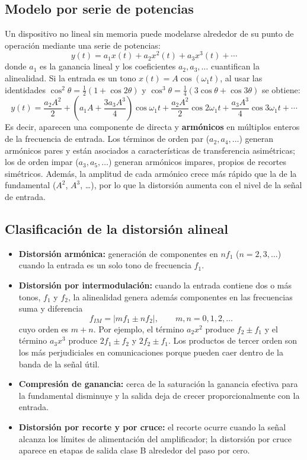 \documentclass[12pt]{article}
\begin{document}
\subsection*{Modelo por serie de potencias}

Un dispositivo no lineal sin memoria puede modelarse alrededor de su punto de operación mediante una serie de potencias:
\[
y(t) = a_1 x(t) + a_2 x^2(t) + a_3 x^3(t) + \cdots
\]
donde $a_1$ es la ganancia lineal y los coeficientes $a_2, a_3, \ldots$ cuantifican la alinealidad. Si la entrada es un tono $x(t) = A\cos(\omega_1 t)$, al usar las identidades $\cos^2\theta = \tfrac{1}{2}(1+\cos 2\theta)$ y $\cos^3\theta = \tfrac{1}{4}(3\cos\theta + \cos 3\theta)$ se obtiene:
\[
y(t) = \frac{a_2A^2}{2} + \left(a_1A + \frac{3a_3A^3}{4}\right)\cos\omega_1 t + \frac{a_2A^2}{2}\cos 2\omega_1 t + \frac{a_3A^3}{4}\cos 3\omega_1 t + \cdots
\]
Es decir, aparecen una componente de directa y \textbf{armónicos} en múltiplos enteros de la frecuencia de entrada. Los términos de orden par ($a_2, a_4, \ldots$) generan armónicos pares y están asociados a características de transferencia asimétricas; los de orden impar ($a_3, a_5, \ldots$) generan armónicos impares, propios de recortes simétricos. Además, la amplitud de cada armónico crece más rápido que la de la fundamental ($A^2$, $A^3$, \ldots), por lo que la distorsión aumenta con el nivel de la señal de entrada.

\subsection*{Clasificación de la distorsión alineal}

\begin{itemize}[label=--]
    \item \textbf{Distorsión armónica:} generación de componentes en $n f_1$ ($n = 2, 3, \ldots$) cuando la entrada es un solo tono de frecuencia $f_1$.
    \item \textbf{Distorsión por intermodulación:} cuando la entrada contiene dos o más tonos, $f_1$ y $f_2$, la alinealidad genera además componentes en las frecuencias suma y diferencia
    \[
    f_{IM} = |m f_1 \pm n f_2|, \qquad m, n = 0, 1, 2, \ldots
    \]
    cuyo orden es $m + n$. Por ejemplo, el término $a_2x^2$ produce $f_2 \pm f_1$ y el término $a_3x^3$ produce $2f_1 \pm f_2$ y $2f_2 \pm f_1$. Los productos de tercer orden son los más perjudiciales en comunicaciones porque pueden caer dentro de la banda de la señal útil.
    \item \textbf{Compresión de ganancia:} cerca de la saturación la ganancia efectiva para la fundamental disminuye y la salida deja de crecer proporcionalmente con la entrada.
    \item \textbf{Distorsión por recorte y por cruce:} el recorte ocurre cuando la señal alcanza los límites de alimentación del amplificador; la distorsión por cruce aparece en etapas de salida clase B alrededor del paso por cero.
\end{itemize}
\end{document}
